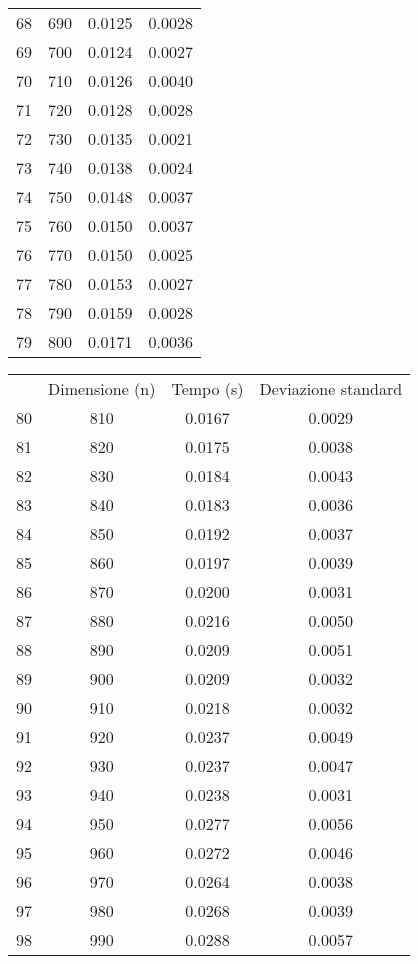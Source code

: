 \begin{table}
\begin{adjustbox}{width=1\textwidth/2}
\begin{tabular}{|c|c|c|c|}
68 & 690 & 0.0125 & 0.0028 \\
\cline{1-4}
69 & 700 & 0.0124 & 0.0027 \\
\cline{1-4}
70 & 710 & 0.0126 & 0.0040 \\
\cline{1-4}
71 & 720 & 0.0128 & 0.0028 \\
\cline{1-4}
72 & 730 & 0.0135 & 0.0021 \\
\cline{1-4}
73 & 740 & 0.0138 & 0.0024 \\
\cline{1-4}
74 & 750 & 0.0148 & 0.0037 \\
\cline{1-4}
75 & 760 & 0.0150 & 0.0037 \\
\cline{1-4}
76 & 770 & 0.0150 & 0.0025 \\
\cline{1-4}
77 & 780 & 0.0153 & 0.0027 \\
\cline{1-4}
78 & 790 & 0.0159 & 0.0028 \\
\cline{1-4}
79 & 800 & 0.0171 & 0.0036 \\
\cline{1-4}
\end{tabular}
\end{adjustbox}
\end{table}

\begin{table}
\centering
\begin{adjustbox}{width=1\textwidth/2}
\begin{tabular}{|c|c|c|c|}
\hline
 & Dimensione (n) & Tempo (s) & Deviazione standard \\
80 & 810 & 0.0167 & 0.0029 \\
\cline{1-4}
81 & 820 & 0.0175 & 0.0038 \\
\cline{1-4}
82 & 830 & 0.0184 & 0.0043 \\
\cline{1-4}
83 & 840 & 0.0183 & 0.0036 \\
\cline{1-4}
84 & 850 & 0.0192 & 0.0037 \\
\cline{1-4}
85 & 860 & 0.0197 & 0.0039 \\
\cline{1-4}
86 & 870 & 0.0200 & 0.0031 \\
\cline{1-4}
87 & 880 & 0.0216 & 0.0050 \\
\cline{1-4}
88 & 890 & 0.0209 & 0.0051 \\
\cline{1-4}
89 & 900 & 0.0209 & 0.0032 \\
\cline{1-4}
90 & 910 & 0.0218 & 0.0032 \\
\cline{1-4}
91 & 920 & 0.0237 & 0.0049 \\
\cline{1-4}
92 & 930 & 0.0237 & 0.0047 \\
\cline{1-4}
93 & 940 & 0.0238 & 0.0031 \\
\cline{1-4}
94 & 950 & 0.0277 & 0.0056 \\
\cline{1-4}
95 & 960 & 0.0272 & 0.0046 \\
\cline{1-4}
96 & 970 & 0.0264 & 0.0038 \\
\cline{1-4}
97 & 980 & 0.0268 & 0.0039 \\
\cline{1-4}
98 & 990 & 0.0288 & 0.0057 \\
\cline{1-4}
\end{tabular}
\end{adjustbox}
\end{table}
